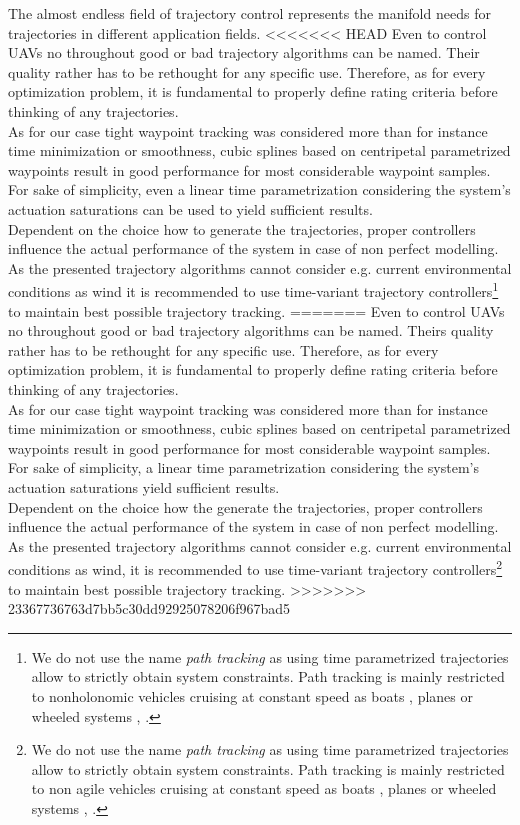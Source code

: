 The almost endless field of trajectory control represents the manifold needs for trajectories in different application fields. 
<<<<<<< HEAD
Even to control UAVs no throughout good or bad trajectory algorithms can be named. Their quality rather has to be rethought for any specific use. Therefore, as for every optimization problem, it is fundamental to properly define rating criteria before thinking of any trajectories. \\
As for our case tight waypoint tracking was considered more than for instance time minimization or smoothness, cubic splines based on centripetal parametrized waypoints result in good performance for most considerable waypoint samples.
For sake of simplicity, even a linear time parametrization considering the system's actuation saturations can be used to yield sufficient results. \\
Dependent on the choice how to generate the trajectories, proper controllers influence the actual performance of the system in case of non perfect modelling. As the presented trajectory algorithms cannot consider e.g. current environmental conditions as wind it is recommended to use time-variant trajectory controllers\footnote{We do not use the name \textit{path tracking} as using time parametrized trajectories allow to strictly obtain system constraints. Path tracking is mainly restricted to nonholonomic vehicles cruising at constant speed as boats \cite{williams}, planes or wheeled systems \cite{deluca}, \cite{snider}.} to maintain best possible trajectory tracking.
=======
Even to control UAVs no throughout good or bad trajectory algorithms can be named. Theirs quality rather has to be rethought for any specific use. Therefore, as for every optimization problem, it is fundamental to properly define rating criteria before thinking of any trajectories. \\
As for our case tight waypoint tracking was considered more than for instance time minimization or smoothness, cubic splines based on centripetal parametrized waypoints result in good performance for most considerable waypoint samples. For sake of simplicity, a linear time parametrization considering the system's actuation saturations yield sufficient results. \\
Dependent on the choice how the generate the trajectories, proper controllers influence the actual performance of the system in case of non perfect modelling. As the presented trajectory algorithms cannot consider e.g. current environmental conditions as wind, it is recommended to use time-variant trajectory controllers\footnote{We do not use the name \textit{path tracking} as using time parametrized trajectories allow to strictly obtain system constraints. Path tracking is mainly restricted to non agile vehicles cruising at constant speed as boats \cite{williams}, planes or wheeled systems \cite{deluca}, \cite{snider}.} to maintain best possible trajectory tracking.
>>>>>>> 23367736763d7bb5c30dd92925078206f967bad5
